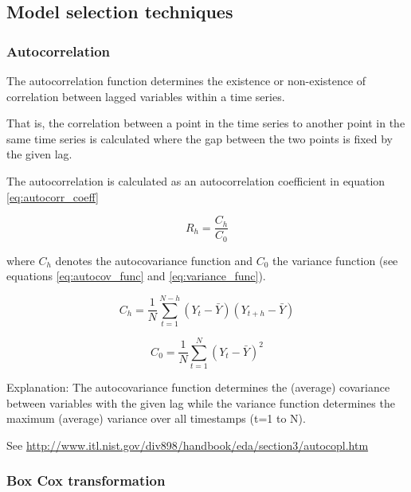 \subsection{Model selection techniques}



\subsubsection{Autocorrelation}



The autocorrelation function determines the existence or non-existence of correlation between lagged variables within a time series. 

That is, the correlation between a point in the time series to another point in the same time series is calculated where the gap between the two points is fixed by the given lag. 

The autocorrelation is calculated as an autocorrelation coefficient in equation \ref{eq:autocorr_coeff}

\begin{equation}
R_h = \frac{C_h}{C_0}
\label{eq:autocorr_coeff}
\end{equation}


where $C_h$ denotes the autocovariance function and $C_0$ the variance function 
(see equations \ref{eq:autocov_func} and \ref{eq:variance_func}). 


\begin{equation}
C_h = \frac{1}{N} \sum\limits_{t=1}^{N-h} (Y_t - \bar{Y}) (Y_{t+h} - \bar{Y})
\label{eq:autocov_func}
\end{equation}


\begin{equation}
C_0 = \frac{1}{N} \sum\limits_{t=1}^{N} (Y_t - \bar{Y})^2
\label{eq:variance_func}
\end{equation}


Explanation: The autocovariance function determines the (average) covariance between variables with the given lag while the variance function determines the maximum (average) variance over all timestamps (t=1 to N). 


See \url{http://www.itl.nist.gov/div898/handbook/eda/section3/autocopl.htm}


\subsubsection{Box Cox transformation}

